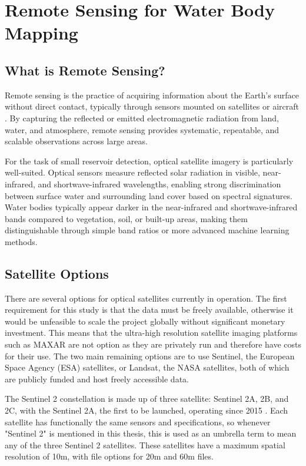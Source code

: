 \section{Remote Sensing for Water Body Mapping}
\subsection{What is Remote Sensing?}
Remote sensing is the practice of acquiring information about the Earth's surface without direct contact, typically through sensors mounted on satellites or aircraft \citep{usgs_2022a}. By capturing the reflected or emitted electromagnetic radiation from land, water, and atmosphere, remote sensing provides systematic, repeatable, and scalable observations across large areas.

For the task of small reservoir detection, optical satellite imagery is particularly well-suited. Optical sensors measure reflected solar radiation in visible, near-infrared, and shortwave-infrared wavelengths, enabling strong discrimination between surface water and surrounding land cover based on spectral signatures. Water bodies typically appear darker in the near-infrared and shortwave-infrared bands compared to vegetation, soil, or built-up areas, making them distinguishable through simple band ratios or more advanced machine learning methods.

\subsection{Satellite Options}
There are several options for optical satellites currently in operation. The first requirement for this study is that the data must be freely available, otherwise it would be unfeasible to scale the project globally without significant monetary investment. This means that the ultra-high resolution satellite imaging platforms such as MAXAR are not option as they are privately run and therefore have costs for their use. The two main remaining options are to use Sentinel, the European Space Agency (ESA) satellites, or Landsat, the NASA satellites, both of which are publicly funded and host freely accessible data.

The Sentinel 2 constellation is made up of three satellite: Sentinel 2A, 2B, and 2C, with the Sentinel 2A, the first to be launched, operating since 2015 \citep{esa_2024}. Each satellite has functionally the same sensors and specifications, so whenever "Sentinel 2" is mentioned in this thesis, this is used as an umbrella term to mean any of the three Sentinel 2 satellites. These satellites have a maximum spatial resolution of 10m, with file options for 20m and 60m files. 

